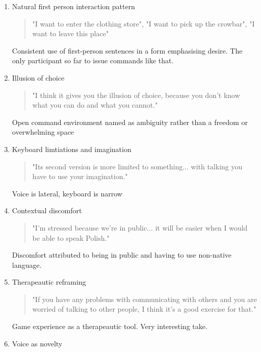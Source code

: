 \begin{enumerate}
    \item Natural first person interaction pattern
    
        \begin{quote}
            "I want to enter the clothing store", "I want to pick up the crowbar", "I want to leave this place" 
        \end{quote}
        Consistent use of first-person sentences in a form emphasising desire. The only participant so far to issue commands like that.
    

    \item Illusion of choice
    
        \begin{quote}
            "I think it gives you the illusion of choice, because you don't know what you can do and what you cannot."
        \end{quote}
        Open command environment named as ambiguity rather than a freedom or overwhelming space

        \item Keyboard limtiations and imagination
    
        \begin{quote}
            "Its second version is more limited to something... with talking you have to use your imagination." 
        \end{quote}
        Voice is lateral, keyboard is narrow


        \item Contextual discomfort
    
        \begin{quote}
            "I'm stressed because we're in public... it will be easier when I would be able to speak Polish."
        \end{quote}
        Discomfort attributed to being in public and having to use non-native language.


        \item Therapeautic reframing
    
        \begin{quote}
            "If you have any problems with communicating with others and you are worried of talking to other people, I think it's a good exercise for that." 
        \end{quote}
        Game experience as a therapeautic tool. Very interesting take.


          \item Voice as novelty
    

\end{enumerate}
